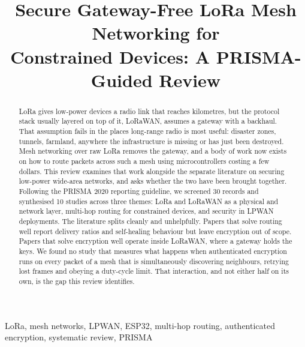 \documentclass[conference]{IEEEtran}
\newcommand{\nIdentified}{30}      %
\newcommand{\nIncluded}{10}        %
\begin{document}
\title{Secure Gateway-Free LoRa Mesh Networking for\\Constrained Devices: A PRISMA-Guided Review}

\author{
}

\maketitle

\begin{abstract}
LoRa gives low-power devices a radio link that reaches kilometres, but the
protocol stack usually layered on top of it, LoRaWAN, assumes a gateway with a
backhaul. That assumption fails in the places long-range radio is most useful:
disaster zones, tunnels, farmland, anywhere the infrastructure is missing or has
just been destroyed. Mesh networking over raw LoRa removes the gateway, and a
body of work now exists on how to route packets across such a mesh using
microcontrollers costing a few dollars. This review examines that work alongside
the separate literature on securing low-power wide-area networks, and asks
whether the two have been brought together. Following the PRISMA 2020 reporting
guideline, we screened \nIdentified{} records and synthesised \nIncluded{}
studies across three themes: LoRa and LoRaWAN as a physical and network layer,
multi-hop routing for constrained devices, and security in LPWAN deployments. The
literature splits cleanly and unhelpfully. Papers that solve routing well report
delivery ratios and self-healing behaviour but leave encryption out of scope.
Papers that solve encryption well operate inside LoRaWAN, where a gateway holds
the keys. We found no study that measures what happens when authenticated
encryption runs on every packet of a mesh that is simultaneously discovering
neighbours, retrying lost frames and obeying a duty-cycle limit. That
interaction, and not either half on its own, is the gap this review identifies.
\end{abstract}

\begin{IEEEkeywords}
LoRa, mesh networks, LPWAN, ESP32, multi-hop routing, authenticated encryption,
systematic review, PRISMA
\end{IEEEkeywords}

\end{document}
